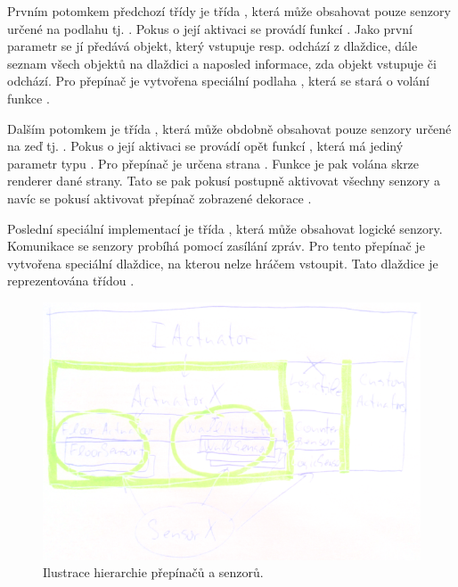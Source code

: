 Prvním potomkem předchozí třídy je třída , která může obsahovat pouze senzory určené
na podlahu tj. . Pokus o její aktivaci se provádí funkcí . Jako první parametr se jí předává objekt,
který vstupuje resp. odchází z dlaždice, dále seznam všech objektů na dlaždici a naposled informace, zda objekt
vstupuje či odchází. Pro přepínač je vytvořena speciální podlaha , která se stará 
o volání funkce .

Dalším potomkem je třída , která může obdobně obsahovat pouze senzory určené na zeď tj. .
Pokus o její aktivaci se provádí opět funkcí , která má jediný parametr typu . Pro přepínač
je určena strana . Funkce  je pak volána skrze renderer dané strany. 
Tato se pak pokusí postupně aktivovat všechny senzory a navíc se pokusí aktivovat přepínač zobrazené dekorace .


Poslední speciální implementací je třída , která může obsahovat logické senzory.
Komunikace se senzory probíhá pomocí zasílání zpráv. Pro tento přepínač je vytvořena speciální dlaždice,
na kterou nelze hráčem vstoupit. Tato dlaždice je reprezentována třídou . 

\begin{figure}[H]\centering
\includegraphics[width=\textwidth]{./img/actuator-sensor-hierarchii.png}
\caption{Ilustrace hierarchie přepínačů a senzorů.}
\label{actuator-sensor-hierarchii}
\end{figure}


